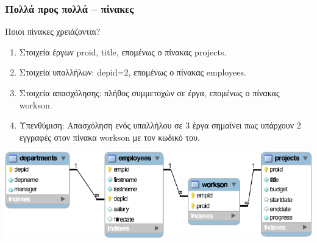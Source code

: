 \begin{frame}
\frametitle{Πολλά προς πολλά -- πίνακες}
\vspace{-0.5cm}
\begin{block}{Ποιοι πίνακες χρειάζονται?}
    \begin{enumerate}
      \item Στοιχεία έργων {\ra proid, title},
            επομένως ο πίνακας {\sq projects}.
      \item Στοιχεία υπαλλήλων: {\ra depid=2},
            επομένως ο πίνακας {\sq employees}.
      \item Στοιχεία απασχόλησης: πλήθος συμμετοχών σε έργα,
            επομένως ο πίνακας {\sq workson}.
      \item Υπενθύμιση: Απασχόληση ενός υπαλλήλου σε 3 έργα σημαίνει πως
            υπάρχουν 2 εγγραφές στον πίνακα {\sq workson} με τον κωδικό του.
    \end{enumerate}
\end{block}
\begin{minipage}{\wE}
  \includegraphics[scale=0.9]{../common/companyREL.pdf}  
\end{minipage}  
\end{frame}



